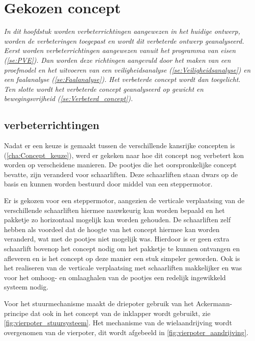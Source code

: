 \chapter{Gekozen concept}
\label{cha:gekozenConcept}

\textit{In dit hoofdstuk worden verbeterrichtingen aangewezen in het huidige ontwerp, worden de verbeteringen toegepast en wordt dit verbeterde ontwerp  geanalyseerd. Eerst worden verbeterrichtingen aangewezen vanuit het programma van eisen (\cref{se:PVE}). Dan worden deze richtingen aangevuld door het maken van een proefmodel en het uitvoeren van een veiligheidsanalyse (\ref{se:Veiligheidsanalyse}) en een faalanalyse (\cref{se:Faalanalyse}). Het verbeterde concept wordt dan toegelicht. Ten slotte wordt het verbeterde concept geanalyseerd op gewicht en bewegingsvrijheid (\cref{se:Verbeterd_concept}).}


\section{verbeterrichtingen}
 Nadat er een keuze is gemaakt tussen de verschillende kansrijke concepten is (\cref{cha:Concept_keuze}), werd er gekeken naar hoe dit concept nog verbetert kon worden op verscheidene manieren. De pootjes die het oorspronkelijke concept bevatte, zijn veranderd voor schaarliften. Deze schaarliften staan dwars op de basis en kunnen worden bestuurd door middel van een steppermotor. 
 
 Er is gekozen voor een steppermotor, aangezien de verticale verplaatsing van de verschillende schaarliften hiermee nauwkeurig kan worden bepaald en het pakketje zo horizontaal mogelijk kan worden gehouden. De schaarliften zelf hebben als voordeel dat de hoogte van het concept hiermee kan worden veranderd, wat met de pootjes niet mogelijk was. Hierdoor is er geen extra schaarlift bovenop het concept nodig om het pakketje te kunnen ontvangen en afleveren en is het concept op deze manier een stuk simpeler geworden. Ook is het realiseren van de verticale verplaatsing met schaarliften makkelijker en was voor het omhoog- en omlaaghalen van de pootjes een redelijk ingewikkeld systeem nodig. 
 
 Voor het stuurmechanisme maakt de driepoter gebruik van het Ackermann-principe dat ook in het concept van de inklapper wordt gebruikt, zie \cref{fig:vierpoter_stuursysteem}. Het mechanisme van de wielaandrijving wordt overgenomen van de vierpoter, dit wordt afgebeeld in \cref{fig:vierpoter_aandrijving}. 
 
